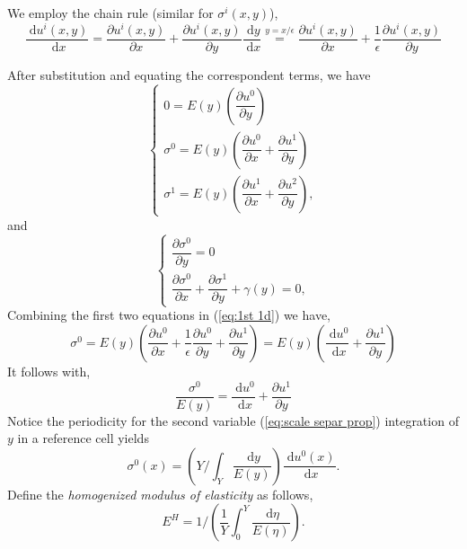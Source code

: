 \documentclass[10pt,a4paper]{scrreprt}
\newcommand{\myd}{\;\mathrm{d}}
\begin{document}
We employ the chain rule (similar for $\sigma^{i}(x, y)$), 
\begin{equation}
\label{eq:2nd 1d}
\dfrac{\myd{u^{i}(x, y)}}{\myd{x}} = \dfrac{\partial u^{i}(x, y)}{\partial x} + \dfrac{\partial u^{i}(x, y)}{\partial y} \dfrac{\myd{y}}{\myd{x}} \stackrel{y=x/\epsilon}{=} \dfrac{\partial u^{i}(x, y)}{\partial x} + \dfrac{1}{\epsilon}\dfrac{\partial u^{i}(x, y)}{\partial y}
\end{equation}

After substitution and equating the correspondent terms, we have
\begin{equation}
\label{eq: to simp 1}
\left\{
\begin{array}{l}
0 = E(y)\left( \dfrac{\partial u^{0}}{\partial y} \right) \\
\sigma^{0} = E(y) \left( \dfrac{\partial u^{0}}{\partial x} + \dfrac{\partial u^{1}}{\partial y} \right) \\
\sigma^{1} = E(y) \left( \dfrac{\partial u^{1}}{\partial x} + \dfrac{\partial u^{2}}{\partial y} \right),
\end{array}
\right.
\end{equation}
and
\begin{equation}
\label{eq: to simp 2}
\left\{
\begin{array}{l}
\dfrac{\partial \sigma^{0}}{\partial y}=0 \\
\dfrac{\partial \sigma^{0}}{\partial x} + \dfrac{\partial \sigma^{1}}{\partial y} + \gamma(y) = 0, 
\end{array}
\right.
\end{equation}
Combining the first two equations in (\ref{eq:1st 1d}) we have,
\begin{equation}
\sigma^{0} = E(y) \left( \dfrac{\partial u^{0}}{\partial x} + \dfrac{1}{\epsilon} \dfrac{\partial u^{0}}{\partial y} + \dfrac{\partial u^{1}}{\partial y} \right) =  E(y) \left( \dfrac{\myd{u^{0}}}{\myd{x}} + \dfrac{\partial u^{1}}{\partial y} \right)
\end{equation}
It follows with, 
\[
\dfrac{\sigma^{0}}{E(y)} = \dfrac{\myd{u^{0}}}{\myd{x}} + \dfrac{\partial u^{1}}{\partial y}
\]
Notice the periodicity for the second variable (\ref{eq:scale separ prop}) integration of $y$ in a reference cell yields
\begin{equation}
\label{eq: sigma 0}
\sigma^{0}(x) = \left(Y/\int_{Y} \dfrac{\myd{y}}{E(y)} \right) \dfrac{\myd{u^{0}(x)}}{\myd{x}}.
\end{equation}
Define the \textit{homogenized modulus of elasticity} as follows,
\begin{equation}
E^{H} = 1/ \left( \dfrac{1}{Y} \int_{0}^{Y} \dfrac{\myd{\eta}}{E(\eta)}\right) .
\end{equation}
\end{document}
